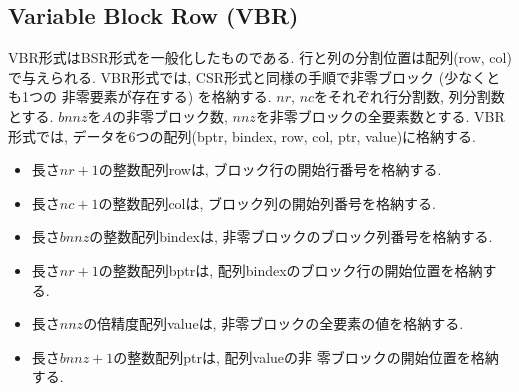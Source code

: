 \documentclass[a4paper]{jarticle}
\begin{document}
{{\newpage
\subsection{Variable Block Row (VBR)}
VBR形式はBSR形式を一般化したものである. 
行と列の分割位置は配列({\ttfamily row, col})で与えられる. 
VBR形式では, CSR形式と同様の手順で非零ブロック (少なくとも1つの
非零要素が存在する) を格納する. 
$nr$, $nc$をそれぞれ行分割数, 列分割数とする. 
$bnnz$を$A$の非零ブロック数, $nnz$を非零ブロックの全要素数とする. 
VBR形式では, データを6つの配列({\ttfamily bptr, bindex, row, col, ptr, value})に格納する. 
\begin{itemize}
\item 長さ$nr+1$の整数配列{\ttfamily row}は, ブロック行の開始行番号を格納する. 
\item 長さ$nc+1$の整数配列{\ttfamily col}は, ブロック列の開始列番号を格納する. 
\item 長さ$bnnz$の整数配列{\ttfamily bindex}は, 非零ブロックのブロック列番号を格納する. 
\item 長さ$nr+1$の整数配列{\ttfamily bptr}は, 配列{\ttfamily bindex}のブロック行の開始位置を格納する. 
\item 長さ$nnz$の倍精度配列{\ttfamily value}は, 非零ブロックの全要素の値を格納する. 
\item 長さ$bnnz+1$の整数配列{\ttfamily ptr}は, 配列{\ttfamily value}の非
      零ブロックの開始位置を格納する. 

\newpage

\end{itemize}}}
\end{document}
